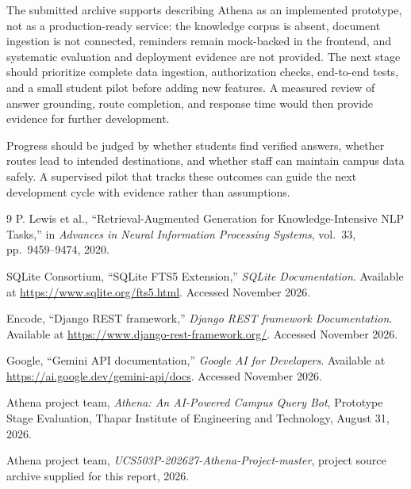 \documentclass[11pt,a4paper]{report}
\begin{document}
The submitted archive supports describing Athena as an implemented prototype,
not as a production-ready service: the knowledge corpus is absent, document
ingestion is not connected, reminders remain mock-backed in the frontend, and
systematic evaluation and deployment evidence are not provided. The next stage
should prioritize complete data ingestion, authorization checks, end-to-end
tests, and a small student pilot before adding new features. A measured review
of answer grounding, route completion, and response time would then provide
evidence for further development.

Progress should be judged by whether students find verified answers, whether
routes lead to intended destinations, and whether staff can maintain campus
data safely. A supervised pilot that tracks these outcomes can guide the next
development cycle with evidence rather than assumptions.

\begin{thebibliography}{9}
P. Lewis et al., ``Retrieval-Augmented Generation for Knowledge-Intensive NLP
Tasks,'' in \emph{Advances in Neural Information Processing Systems}, vol.~33,
pp.~9459--9474, 2020.

SQLite Consortium, ``SQLite FTS5 Extension,'' \emph{SQLite Documentation}.
Available at \url{https://www.sqlite.org/fts5.html}. Accessed November 2026.

Encode, ``Django REST framework,'' \emph{Django REST framework Documentation}.
Available at \url{https://www.django-rest-framework.org/}. Accessed November 2026.

Google, ``Gemini API documentation,'' \emph{Google AI for Developers}.
Available at \url{https://ai.google.dev/gemini-api/docs}. Accessed November 2026.

Athena project team, \emph{Athena: An AI-Powered Campus Query Bot}, Prototype
Stage Evaluation, Thapar Institute of Engineering and Technology, August 31, 2026.

Athena project team, \emph{UCS503P-202627-Athena-Project-master}, project source
archive supplied for this report, 2026.
\end{thebibliography}
\end{document}
